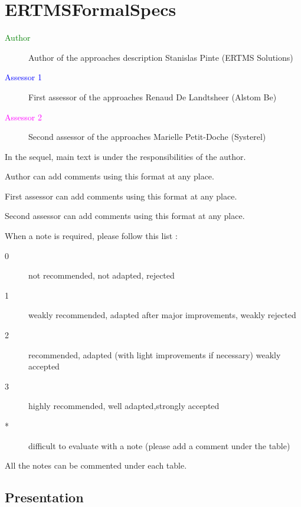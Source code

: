 \chapter{ERTMSFormalSpecs}

\begin{description}
\item[\textcolor{green}{Author}] Author of the approaches description  Stanislas Pinte (ERTMS Solutions)
\item[\textcolor{blue}{Assessor 1}] First assessor of the approaches Renaud De Landtsheer (Alstom Be)
\item[\textcolor{magenta}{Assessor 2}] Second assessor of the approaches Marielle Petit-Doche (Systerel)
\end{description}

In the sequel, main text is under the responsibilities of the author.

\begin{author_comment}
Author can add comments using this format at any place.
\end{author_comment}

\begin{assessor1}
First assessor can add comments using this format at any place.
\end{assessor1}

\begin{assessor2}
Second assessor can add comments using this format at any place.
\end{assessor2}

When a note is required, please follow this list :
\begin{description}
\item[0] not recommended, not adapted, rejected
\item[1] weakly recommended, adapted after major improvements, weakly rejected
\item[2] recommended, adapted (with light improvements if necessary)  weakly accepted
\item[3] highly recommended, well adapted,strongly accepted
\item[*] difficult to evaluate with a note (please add a comment under the table)
\end{description}

All the notes can be commented under each table.

\section{Presentation}

